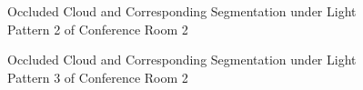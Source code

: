 \documentclass[11pt, a4paper,oneside,chapterprefix=false]{scrbook}
\begin{document}
\begin{figure}[H]
    \centering
      \label{fig:conf2 1 occluded} \hfill
     \label{fig:conf2 1 seg}
    \caption{Occluded Cloud and Corresponding Segmentation under Light Pattern 2 of Conference Room 2}
    \label{fig:conf2 1 occ and seg}
\end{figure}

\begin{figure}[H]
    \centering
      \label{fig:conf2 2 occluded} \hfill
     \label{fig:conf2 2 seg}
    \caption{Occluded Cloud and Corresponding Segmentation under Light Pattern 3 of Conference Room 2}
    \label{fig:conf2 2 occ and seg}
\end{figure}
\end{document}
